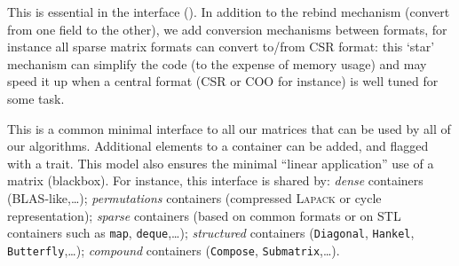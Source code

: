 %
		This is essential in the \applin interface ().
%
		In addition to the rebind mechanism (convert from one field to the other), we add
%
	 conversion mechanisms between formats, for instance all
	 sparse matrix formats can convert to/from CSR format:  this `star'
	 mechanism can simplify the code (to the expense of memory usage) and
	 may speed it up when a central format (CSR or COO for instance) is
	 well tuned for some task.
%
	 \par
%
This is a common minimal interface to all our matrices that can be used by all
of our algorithms. Additional elements to a container can be added, and flagged
with a trait. This model also ensures the minimal ``linear application'' use of a
matrix (blackbox).  For instance, this interface is shared by: \emph{dense}
containers (BLAS-like,\ldots); \emph{permutations} containers (compressed
\textsc{Lapack} or cycle representation); \emph{sparse} containers (based on
common formats or on STL containers such as {\tt map}, {\tt deque},\ldots);
\emph{structured} containers ({\tt Diagonal}, {\tt Hankel}, {\tt Butterfly},\ldots);
\emph{compound} containers ({\tt Compose}, {\tt Submatrix},\ldots).
%
